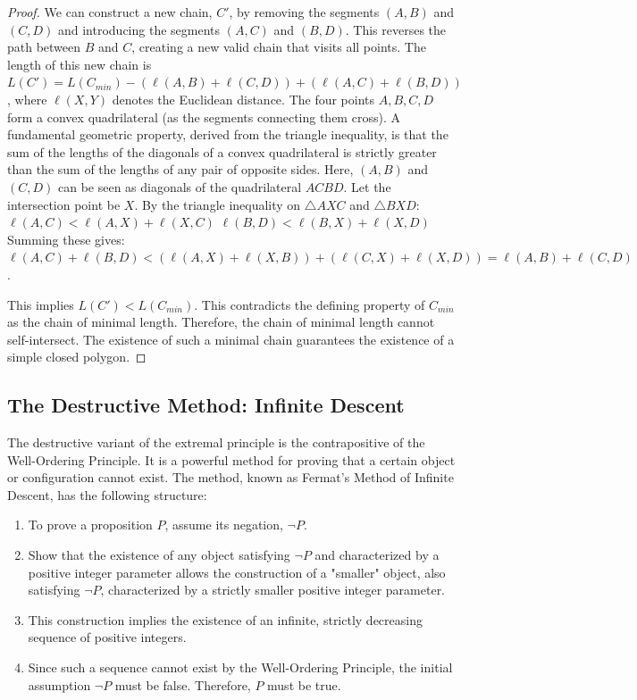 \begin{theorem}
\begin{proof}
We can construct a new chain, $C'$, by removing the segments $(A,B)$ and $(C,D)$ and introducing the segments $(A,C)$ and $(B,D)$. This reverses the path between $B$ and $C$, creating a new valid chain that visits all points.
The length of this new chain is $L(C') = L(C_{min}) - (\ell(A,B) + \ell(C,D)) + (\ell(A,C) + \ell(B,D))$, where $\ell(X,Y)$ denotes the Euclidean distance.
The four points $A, B, C, D$ form a convex quadrilateral (as the segments connecting them cross). A fundamental geometric property, derived from the triangle inequality, is that the sum of the lengths of the diagonals of a convex quadrilateral is strictly greater than the sum of the lengths of any pair of opposite sides. Here, $(A,B)$ and $(C,D)$ can be seen as diagonals of the quadrilateral $ACBD$. Let the intersection point be $X$. By the triangle inequality on $\triangle AXC$ and $\triangle BXD$:
$\ell(A,C) < \ell(A,X) + \ell(X,C)$
$\ell(B,D) < \ell(B,X) + \ell(X,D)$
Summing these gives:
$\ell(A,C) + \ell(B,D) < (\ell(A,X)+\ell(X,B)) + (\ell(C,X)+\ell(X,D)) = \ell(A,B) + \ell(C,D)$.

This implies $L(C') < L(C_{min})$. This contradicts the defining property of $C_{min}$ as the chain of minimal length.
Therefore, the chain of minimal length cannot self-intersect. The existence of such a minimal chain guarantees the existence of a simple closed polygon.
\end{proof}

\subsection{The Destructive Method: Infinite Descent}

The destructive variant of the extremal principle is the contrapositive of the Well-Ordering Principle. It is a powerful method for proving that a certain object or configuration cannot exist. The method, known as Fermat's Method of Infinite Descent, has the following structure:
\begin{enumerate}
    \item To prove a proposition $P$, assume its negation, $\neg P$.
    \item Show that the existence of any object satisfying $\neg P$ and characterized by a positive integer parameter allows the construction of a "smaller" object, also satisfying $\neg P$, characterized by a strictly smaller positive integer parameter.
    \item This construction implies the existence of an infinite, strictly decreasing sequence of positive integers.
    \item Since such a sequence cannot exist by the Well-Ordering Principle, the initial assumption $\neg P$ must be false. Therefore, $P$ must be true.
\end{enumerate}


\end{theorem}
